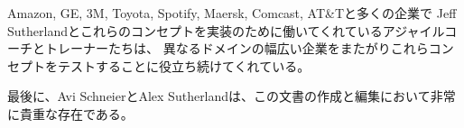 \documentclass[12pt,a4paper,parskip=full]{scrartcl}
\begin{document}
Amazon, GE, 3M, Toyota, Spotify, Maersk, Comcast, AT\&Tと多くの企業で
Jeff Sutherlandとこれらのコンセプトを実装のために働いてくれているアジャイルコーチとトレーナーたちは、
異なるドメインの幅広い企業をまたがりこれらコンセプトをテストすることに役立ち続けてくれている。

最後に、Avi SchneierとAlex Sutherlandは、この文書の作成と編集において非常に貴重な存在である。

\pagebreak

\printbibliography
\end{document}
